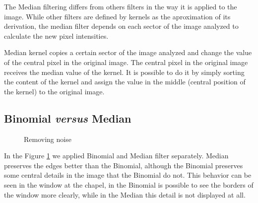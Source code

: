 \documentclass{article}
\begin{document}
		The Median filtering differs from others filters in the way it is applied to the image. While other filters are defined by kernels as the aproximation of its derivation, the median filter depends on each sector of the image analyzed to calculate the new pixel intensities.

		Median kernel copies a certain sector of the image analyzed and change the value of the central pixel in the original image. The central pixel in the original image receives the median value of the kernel. It is possible to do it by simply sorting the content of the kernel and assign the value in the middle (central position of the kernel) to the original image. 

	\subsection{Binomial {\it versus} Median}

		\begin{figure}[H]
		  \centering
		  \caption{Removing noise}
		  \label{fig:removingnoise}
		\end{figure}		

	In the Figure \ref{fig:removingnoise} we applied Binomial and Median filter separately. 
	Median preserves the edges better than the Binomial, although the Binomial preserves some central details in the image that the Binomial do not. 
	This behavior can be seen in the window at the chapel, in the Binomial is possible to see the borders of the window more clearly, while in the Median this detail is not displayed at all. 
\end{document}
